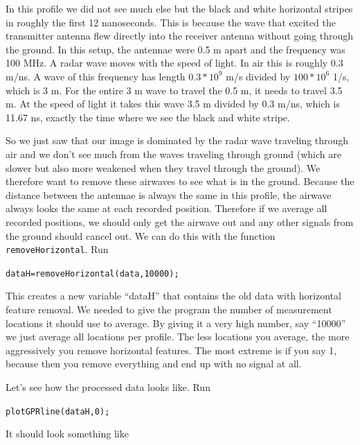 \documentclass[11pt]{article}
\begin{document}
In this profile we did not see much else but the black and white
horizontal stripes in roughly the first 12 nanoseconds. This is
because the wave that excited the transmitter antenna flew directly
into the receiver antenna without going through the ground. In this
setup, the antennae were 0.5 m apart and the frequency was 100 MHz. A
radar wave moves with the speed of light. In air this is roughly 0.3
m/ns. A wave of this frequency has length $0.3*10^9$ m/s divided by
$100*10^6$ 1/s, which is 3 m. For the entire 3 m wave to travel the
0.5 m, it needs to travel 3.5 m. At the speed of light it takes this
wave 3.5 m divided by 0.3 m/ns, which is 11.67 ns, exactly the time
where we see the black and white stripe.

So we just saw that our image is dominated by the radar wave traveling
through air and we don't see much from the waves traveling through
ground (which are slower but also more weakened when they travel
through the ground). We therefore want to remove these airwaves to see
what is in the ground. Because the distance between the antennae is
always the same in this profile, the airwave always looks the same at
each recorded position. Therefore if we average all recorded
positions, we should only get the airwave out and any other signals
from the ground should cancel out. We can do this with the function
\verb#removeHorizontal#. Run

\qquad\verb#dataH=removeHorizontal(data,10000);#

This creates a new variable ``dataH'' that contains the old data with
horizontal feature removal. We needed to give the program the number
of measurement locations it should use to average. By giving it a very
high number, say ``10000'' we just average all locations per
profile. The less locations you average, the more aggressively you
remove horizontal features. The most extreme is if you say 1, because
then you remove everything and end up with no signal at all.

Let's see how the processed data looks like. Run

\qquad \verb#plotGPRline(dataH,0);#

It should look something like
\end{document}
